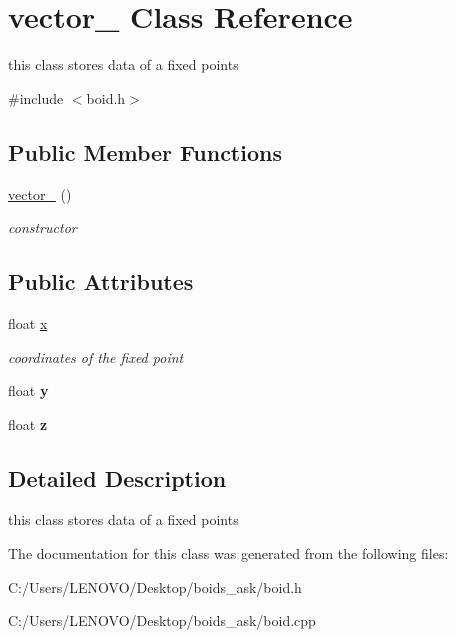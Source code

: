 \hypertarget{classvector__3}{}\section{vector\+\_ Class Reference}
\label{classvector__3}


this class stores data of a fixed points  




{\ttfamily \#include $<$boid.\+h$>$}

\subsection*{Public Member Functions}
\begin{DoxyCompactItemize}
\item 
\mbox{\label{classvector__3_a855f1ffabc8fefee0cd7f739bc4d6963}} 
\mbox{\hyperlink{classvector__3_a855f1ffabc8fefee0cd7f739bc4d6963}{vector\+\_}} ()
\begin{DoxyCompactList}\small\item\em constructor \end{DoxyCompactList}\end{DoxyCompactItemize}
\subsection*{Public Attributes}
\begin{DoxyCompactItemize}
\item 
\mbox{\label{classvector__3_ac144791d12138dcda9eb7ff82676844f}} 
float \mbox{\hyperlink{classvector__3_ac144791d12138dcda9eb7ff82676844f}{x}}
\begin{DoxyCompactList}\small\item\em coordinates of the fixed point \end{DoxyCompactList}\item 
\mbox{\label{classvector__3_a08a37e090e1cc883cac44975a0f0880d}} 
float {\bfseries y}
\item 
\mbox{\label{classvector__3_a7b49b64f43db507e0c77e3413378a957}} 
float {\bfseries z}
\end{DoxyCompactItemize}


\subsection{Detailed Description}
this class stores data of a fixed points 

The documentation for this class was generated from the following files\+:\begin{DoxyCompactItemize}
\item 
C\+:/\+Users/\+L\+E\+N\+O\+V\+O/\+Desktop/boids\+\_\+ask/boid.\+h\item 
C\+:/\+Users/\+L\+E\+N\+O\+V\+O/\+Desktop/boids\+\_\+ask/boid.\+cpp\end{DoxyCompactItemize}
